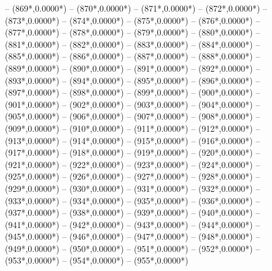 {		-- ({869*\dx},{0.0000*\dy})
		-- ({870*\dx},{0.0000*\dy})
		-- ({871*\dx},{0.0000*\dy})
		-- ({872*\dx},{0.0000*\dy})
		-- ({873*\dx},{0.0000*\dy})
		-- ({874*\dx},{0.0000*\dy})
		-- ({875*\dx},{0.0000*\dy})
		-- ({876*\dx},{0.0000*\dy})
		-- ({877*\dx},{0.0000*\dy})
		-- ({878*\dx},{0.0000*\dy})
		-- ({879*\dx},{0.0000*\dy})
		-- ({880*\dx},{0.0000*\dy})
		-- ({881*\dx},{0.0000*\dy})
		-- ({882*\dx},{0.0000*\dy})
		-- ({883*\dx},{0.0000*\dy})
		-- ({884*\dx},{0.0000*\dy})
		-- ({885*\dx},{0.0000*\dy})
		-- ({886*\dx},{0.0000*\dy})
		-- ({887*\dx},{0.0000*\dy})
		-- ({888*\dx},{0.0000*\dy})
		-- ({889*\dx},{0.0000*\dy})
		-- ({890*\dx},{0.0000*\dy})
		-- ({891*\dx},{0.0000*\dy})
		-- ({892*\dx},{0.0000*\dy})
		-- ({893*\dx},{0.0000*\dy})
		-- ({894*\dx},{0.0000*\dy})
		-- ({895*\dx},{0.0000*\dy})
		-- ({896*\dx},{0.0000*\dy})
		-- ({897*\dx},{0.0000*\dy})
		-- ({898*\dx},{0.0000*\dy})
		-- ({899*\dx},{0.0000*\dy})
		-- ({900*\dx},{0.0000*\dy})
		-- ({901*\dx},{0.0000*\dy})
		-- ({902*\dx},{0.0000*\dy})
		-- ({903*\dx},{0.0000*\dy})
		-- ({904*\dx},{0.0000*\dy})
		-- ({905*\dx},{0.0000*\dy})
		-- ({906*\dx},{0.0000*\dy})
		-- ({907*\dx},{0.0000*\dy})
		-- ({908*\dx},{0.0000*\dy})
		-- ({909*\dx},{0.0000*\dy})
		-- ({910*\dx},{0.0000*\dy})
		-- ({911*\dx},{0.0000*\dy})
		-- ({912*\dx},{0.0000*\dy})
		-- ({913*\dx},{0.0000*\dy})
		-- ({914*\dx},{0.0000*\dy})
		-- ({915*\dx},{0.0000*\dy})
		-- ({916*\dx},{0.0000*\dy})
		-- ({917*\dx},{0.0000*\dy})
		-- ({918*\dx},{0.0000*\dy})
		-- ({919*\dx},{0.0000*\dy})
		-- ({920*\dx},{0.0000*\dy})
		-- ({921*\dx},{0.0000*\dy})
		-- ({922*\dx},{0.0000*\dy})
		-- ({923*\dx},{0.0000*\dy})
		-- ({924*\dx},{0.0000*\dy})
		-- ({925*\dx},{0.0000*\dy})
		-- ({926*\dx},{0.0000*\dy})
		-- ({927*\dx},{0.0000*\dy})
		-- ({928*\dx},{0.0000*\dy})
		-- ({929*\dx},{0.0000*\dy})
		-- ({930*\dx},{0.0000*\dy})
		-- ({931*\dx},{0.0000*\dy})
		-- ({932*\dx},{0.0000*\dy})
		-- ({933*\dx},{0.0000*\dy})
		-- ({934*\dx},{0.0000*\dy})
		-- ({935*\dx},{0.0000*\dy})
		-- ({936*\dx},{0.0000*\dy})
		-- ({937*\dx},{0.0000*\dy})
		-- ({938*\dx},{0.0000*\dy})
		-- ({939*\dx},{0.0000*\dy})
		-- ({940*\dx},{0.0000*\dy})
		-- ({941*\dx},{0.0000*\dy})
		-- ({942*\dx},{0.0000*\dy})
		-- ({943*\dx},{0.0000*\dy})
		-- ({944*\dx},{0.0000*\dy})
		-- ({945*\dx},{0.0000*\dy})
		-- ({946*\dx},{0.0000*\dy})
		-- ({947*\dx},{0.0000*\dy})
		-- ({948*\dx},{0.0000*\dy})
		-- ({949*\dx},{0.0000*\dy})
		-- ({950*\dx},{0.0000*\dy})
		-- ({951*\dx},{0.0000*\dy})
		-- ({952*\dx},{0.0000*\dy})
		-- ({953*\dx},{0.0000*\dy})
		-- ({954*\dx},{0.0000*\dy})
		-- ({955*\dx},{0.0000*\dy})
}
